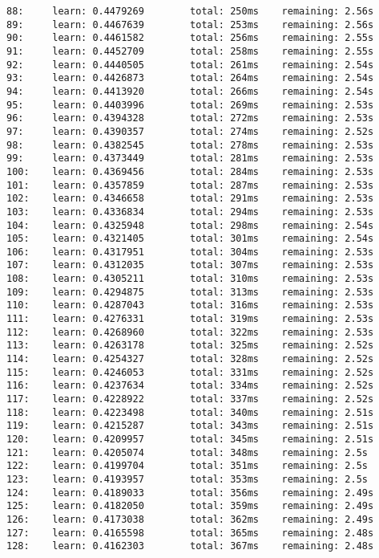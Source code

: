 \documentclass[11pt]{article}
\begin{document}
\begin{Verbatim}[commandchars=\\\{\}]
88:     learn: 0.4479269        total: 250ms    remaining: 2.56s
89:     learn: 0.4467639        total: 253ms    remaining: 2.56s
90:     learn: 0.4461582        total: 256ms    remaining: 2.55s
91:     learn: 0.4452709        total: 258ms    remaining: 2.55s
92:     learn: 0.4440505        total: 261ms    remaining: 2.54s
93:     learn: 0.4426873        total: 264ms    remaining: 2.54s
94:     learn: 0.4413920        total: 266ms    remaining: 2.54s
95:     learn: 0.4403996        total: 269ms    remaining: 2.53s
96:     learn: 0.4394328        total: 272ms    remaining: 2.53s
97:     learn: 0.4390357        total: 274ms    remaining: 2.52s
98:     learn: 0.4382545        total: 278ms    remaining: 2.53s
99:     learn: 0.4373449        total: 281ms    remaining: 2.53s
100:    learn: 0.4369456        total: 284ms    remaining: 2.53s
101:    learn: 0.4357859        total: 287ms    remaining: 2.53s
102:    learn: 0.4346658        total: 291ms    remaining: 2.53s
103:    learn: 0.4336834        total: 294ms    remaining: 2.53s
104:    learn: 0.4325948        total: 298ms    remaining: 2.54s
105:    learn: 0.4321405        total: 301ms    remaining: 2.54s
106:    learn: 0.4317951        total: 304ms    remaining: 2.53s
107:    learn: 0.4312035        total: 307ms    remaining: 2.53s
108:    learn: 0.4305211        total: 310ms    remaining: 2.53s
109:    learn: 0.4294875        total: 313ms    remaining: 2.53s
110:    learn: 0.4287043        total: 316ms    remaining: 2.53s
111:    learn: 0.4276331        total: 319ms    remaining: 2.53s
112:    learn: 0.4268960        total: 322ms    remaining: 2.53s
113:    learn: 0.4263178        total: 325ms    remaining: 2.52s
114:    learn: 0.4254327        total: 328ms    remaining: 2.52s
115:    learn: 0.4246053        total: 331ms    remaining: 2.52s
116:    learn: 0.4237634        total: 334ms    remaining: 2.52s
117:    learn: 0.4228922        total: 337ms    remaining: 2.52s
118:    learn: 0.4223498        total: 340ms    remaining: 2.51s
119:    learn: 0.4215287        total: 343ms    remaining: 2.51s
120:    learn: 0.4209957        total: 345ms    remaining: 2.51s
121:    learn: 0.4205074        total: 348ms    remaining: 2.5s
122:    learn: 0.4199704        total: 351ms    remaining: 2.5s
123:    learn: 0.4193957        total: 353ms    remaining: 2.5s
124:    learn: 0.4189033        total: 356ms    remaining: 2.49s
125:    learn: 0.4182050        total: 359ms    remaining: 2.49s
126:    learn: 0.4173038        total: 362ms    remaining: 2.49s
127:    learn: 0.4165598        total: 365ms    remaining: 2.48s
128:    learn: 0.4162303        total: 367ms    remaining: 2.48s

\end{Verbatim}
\end{document}
